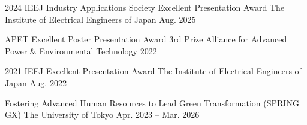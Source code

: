 
\begin{cvhonors}

  \cvhonor
    {2024 IEEJ Industry Applications Society Excellent Presentation Award} %
    {The Institute of Electrical Engineers of Japan} %
    {} %
    {Aug. 2025} %

  \cvhonor
    {APET Excellent Poster Presentation Award 3rd Prize} %
    {Alliance for Advanced Power \& Environmental Technology} %
    {} %
    {2022} %
    
  \cvhonor
    {2021 IEEJ Excellent Presentation Award} %
    {The Institute of Electrical Engineers of Japan} %
    {} %
    {Aug. 2022} %

\end{cvhonors}

\begin{cvhonors}

  \cvhonor
    {Fostering Advanced Human Resources to Lead Green Transformation (SPRING GX)} %
    {The University of Tokyo} %
    {} %
    {Apr. 2023 -- Mar. 2026} %

\end{cvhonors}

